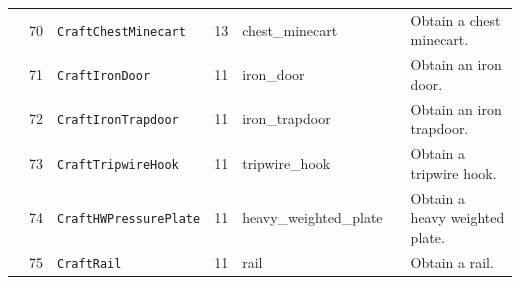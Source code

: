 \begin{table}[H]
{\begin{tabular}{@{}cclclcl@{}}
                      & 70  & \texttt{CraftChestMinecart}              & 13              & chest\_minecart                  &                         & Obtain a chest minecart.                \\
                      & 71  & \texttt{CraftIronDoor}                   & 11              & iron\_door                       &                         & Obtain an iron door.                    \\
                      & 72  & \texttt{CraftIronTrapdoor}               & 11              & iron\_trapdoor                   &                         & Obtain an iron trapdoor.                \\
                      & 73  & \texttt{CraftTripwireHook}               & 11              & tripwire\_hook                   &                         & Obtain a tripwire hook.                 \\
                      & 74  & \texttt{CraftHWPressurePlate} & 11              & heavy\_weighted\_plate &                         & Obtain a heavy weighted plate. \\
                      & 75  & \texttt{CraftRail}                       & 11              & rail                             &                         & Obtain a rail.                        \\ \bottomrule
\end{tabular}}
\end{table}

\begin{table}[H]
\caption{Task details on MT8 \textbf{Challenge} set.}
\label{tab:mt8_task_list}
\end{table}


